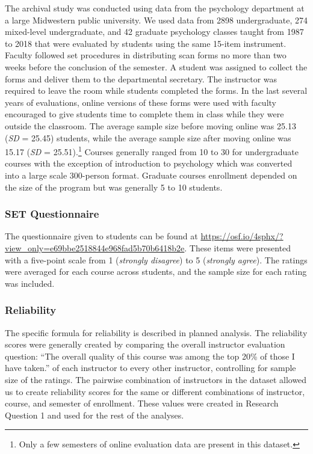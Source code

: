 \documentclass[
  man,mask]{apa7}
\begin{document}
The archival study was conducted using data from the psychology
department at a large Midwestern public university. We used data from
2898
undergraduate, 274
mixed-level undergraduate, and
42 graduate
psychology classes taught from 1987 to 2018 that were evaluated by
students using the same 15-item instrument. Faculty followed set
procedures in distributing scan forms no more than two weeks before the
conclusion of the semester. A student was assigned to collect the forms
and deliver them to the departmental secretary. The instructor was
required to leave the room while students completed the forms. In the
last several years of evaluations, online versions of these forms were
used with faculty encouraged to give students time to complete them in
class while they were outside the classroom. The average sample size
before moving online was 25.13 (\emph{SD} = 25.45) students, while the
average sample size after moving online was 15.17 (\emph{SD} = 25.51).\footnote{Only
  a few semesters of online evaluation data are present in this dataset.}
Courses generally ranged from 10 to 30 for undergraduate courses with
the exception of introduction to psychology which was converted into a
large scale 300-person format. Graduate courses enrollment depended on
the size of the program but was generally 5 to 10 students.

\subsubsection{SET Questionnaire}\label{set-questionnaire}

The questionnaire given to students can be found at
\url{https://osf.io/4sphx/?view_only=e69bbe2518844e968fad5b70b6418b2e}. These items were presented with a five-point
scale from 1 (\emph{strongly disagree}) to 5 (\emph{strongly agree}). The ratings were averaged for each course across students, and the sample size for each rating was included.

\subsubsection{Reliability}\label{reliability-1}

The specific formula for reliability is described in planned analysis. The reliability scores were generally created by comparing the overall instructor evaluation question: ``The overall quality of this course was among the top 20\% of those I have taken.'' of each instructor to every other instructor, controlling for sample size of the ratings. The pairwise combination of instructors in the dataset allowed us to create reliability scores for the same or different combinations of instructor, course, and semester of enrollment. These values were created in Research Question 1 and used for the rest of the analyses.
\end{document}
